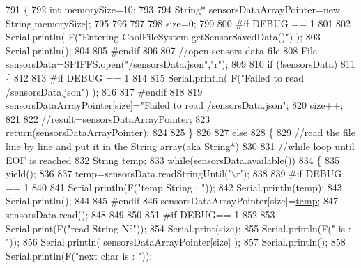 \begin{DoxyCode}
791 \{
792     \textcolor{keywordtype}{int} memorySize=10;
793     
794     String* sensorsDataArrayPointer=\textcolor{keyword}{new} String[memorySize];
795     
796     
797 
798     size=0;
799 
800 \textcolor{preprocessor}{#if DEBUG == 1 }
801 
802     Serial.println( F(\textcolor{stringliteral}{"Entering CoolFileSystem.getSensorSavedData()"}) );
803     Serial.println();
804 
805 \textcolor{preprocessor}{#endif}
806 
807     \textcolor{comment}{//open sensors data file}
808     File sensorsData=SPIFFS.open(\textcolor{stringliteral}{"/sensorsData.json"},\textcolor{stringliteral}{"r"});
809     
810     \textcolor{keywordflow}{if} (!sensorsData)
811     \{
812 
813 \textcolor{preprocessor}{    #if DEBUG == 1 }
814 
815         Serial.println( F(\textcolor{stringliteral}{"Failed to read /sensorsData.json"}) );
816 
817 \textcolor{preprocessor}{    #endif}
818          
819         sensorsDataArrayPointer[size]=\textcolor{stringliteral}{"Failed to read /sensorsData.json"};
820         size++;
821 
822         \textcolor{comment}{//result=sensorsDataArrayPointer;}
823         \textcolor{keywordflow}{return}(sensorsDataArrayPointer);
824 
825     \}
826 
827     \textcolor{keywordflow}{else}
828     \{
829         \textcolor{comment}{//read the file line by line and put it in the String array(aka String*)        }
830 
831         \textcolor{comment}{//while loop until EOF is reached}
832         String \hyperlink{Irene3000_8h_a5905d48604152cf57aa6bfa087b49173}{temp};
833         \textcolor{keywordflow}{while}(sensorsData.available())
834         \{
835             yield();
836 
837             temp=sensorsData.readStringUntil(\textcolor{charliteral}{'\(\backslash\)r'});
838 
839 \textcolor{preprocessor}{        #if DEBUG == 1}
840 
841             Serial.println(F(\textcolor{stringliteral}{"temp String : "}));
842             Serial.println(temp);
843             Serial.println();
844             
845 \textcolor{preprocessor}{        #endif}
846             sensorsDataArrayPointer[size]=\hyperlink{Irene3000_8h_a5905d48604152cf57aa6bfa087b49173}{temp};
847             sensorsData.read();
848             
849             
850         
851 \textcolor{preprocessor}{        #if DEBUG== 1}
852  
853             Serial.print(F(\textcolor{stringliteral}{"read String N°"}));
854             Serial.print(size);
855             Serial.println(F(\textcolor{stringliteral}{" is : "}));
856             Serial.println( sensorsDataArrayPointer[size] );
857             Serial.println();
858             Serial.println(F(\textcolor{stringliteral}{"next char is : "}));

\end{DoxyCode}
